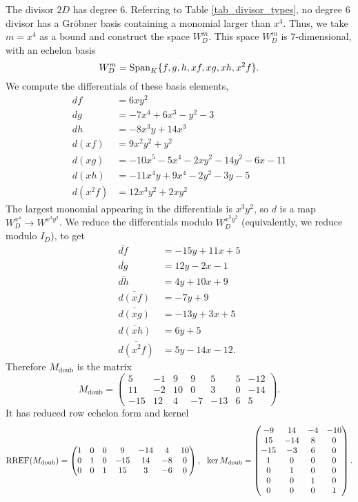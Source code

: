 The divisor $2D$ has degree 6.
Referring to Table \ref{tab_divisor_types}, no degree 6 divisor has a Gr\"obner basis containing a monomial larger than $x^4$.
Thus, we take $m = x^4$ as a bound and construct the space $W_D^m$.
This space $W_D^m$ is 7-dimensional, with an echelon basis
\[ W_D^m = \operatorname{Span}_K\{ f, g, h, xf, xg, xh, x^2f \}. \]
We compute the differentials of these basis elements,
\begin{align*}
  df      &= 6xy^2 \\
  dg      &= -7x^4 + 6x^3 - y^2 - 3 \\
  dh      &= -8x^3y + 14x^3 \\
  d(xf)   &= 9x^2y^2 + y^2 \\
  d(xg)   &= -10x^5 - 5x^4 - 2xy^2 - 14y^2 - 6x - 11 \\
  d(xh)   &= -11x^4y + 9x^4 - 2y^2 - 3y - 5 \\
  d(x^2f) &= 12x^3y^2 + 2xy^2
\end{align*}
The largest monomial appearing in the differentials is $x^3y^2$, so $d$ is a map $W_D^{x^4} \to W^{x^3y^2}$.
We reduce the differentials modulo $W_D^{x^3y^2}$ (equivalently, we reduce modulo $I_D$), to get
\begin{align*}
  \bar{df}      &= -15y + 11x + 5 \\
  \bar{dg}      &= 12y - 2x - 1 \\
  \bar{dh}      &= 4y + 10x + 9 \\
  \bar{d(xf)}   &= -7y + 9 \\
  \bar{d(xg)}   &= -13y + 3x + 5 \\
  \bar{d(xh)}   &= 6y + 5 \\
  \bar{d(x^2f)} &= 5y - 14x - 12.
\end{align*}
Therefore $M_{\text{doub}}$ is the matrix
\[ M_{\text{doub}} = \begin{pmatrix}
  5 & -1 & 9 & 9 & 5 & 5 & -12 \\
  11 & -2 & 10 & 0 & 3 & 0 & -14 \\
  -15 & 12 & 4 & -7 & -13 & 6 & 5
\end{pmatrix}. \]
It has reduced row echelon form and kernel
\[ \operatorname{RREF}(M_{\text{doub}}) = \begin{pmatrix}
  1 & 0 & 0 &   9 & -14 &  4 & 10 \\
  0 & 1 & 0 & -15 &  14 & -8 &  0 \\
  0 & 0 & 1 &  15 &   3 & -6 &  0
\end{pmatrix}, ~~
\ker M_{\text{doub}} = \begin{pmatrix}
   -9 &  14 & -4 & -10 \\
   15 & -14 &  8 &   0 \\
  -15 &  -3 &  6 &   0 \\
    1 &   0 &  0 &   0 \\
    0 &   1 &  0 &   0 \\
    0 &   0 &  1 &   0 \\
    0 &   0 &  0 &   1
\end{pmatrix}. \]
